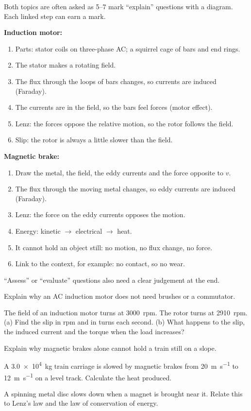 \begin{examtip}[breakable]
Both topics are often asked as 5--7 mark ``explain'' questions with a diagram. Each
linked step can earn a mark.

\textbf{Induction motor:}
\begin{enumerate}
  \item Parts: stator coils on three-phase AC; a squirrel cage of bars and end rings.
  \item The stator makes a rotating field.
  \item The flux through the loops of bars changes, so currents are induced (Faraday).
  \item The currents are in the field, so the bars feel forces (motor effect).
  \item Lenz: the forces oppose the relative motion, so the rotor follows the field.
  \item Slip: the rotor is always a little slower than the field.
\end{enumerate}
\textbf{Magnetic brake:}
\begin{enumerate}
  \item Draw the metal, the field, the eddy currents and the force opposite to $v$.
  \item The flux through the moving metal changes, so eddy currents are induced
        (Faraday).
  \item Lenz: the force on the eddy currents opposes the motion.
  \item Energy: kinetic $\to$ electrical $\to$ heat.
  \item It cannot hold an object still: no motion, no flux change, no force.
  \item Link to the context, for example: no contact, so no wear.
\end{enumerate}
``Assess'' or ``evaluate'' questions also need a clear judgement at the end.
\end{examtip}

\begin{quickcheck}[breakable]
  \item Explain why an AC induction motor does not need brushes or a commutator.
  \item The field of an induction motor turns at \qty{3000}{rpm}. The rotor turns at
        \qty{2910}{rpm}. (a) Find the slip in rpm and in turns each second. (b) What
        happens to the slip, the induced current and the torque when the load increases?
  \item Explain why magnetic brakes alone cannot hold a train still on a slope.
  \item A \qty{3.0e4}{kg} train carriage is slowed by magnetic brakes from
        \qty{20}{m.s^{-1}} to \qty{12}{m.s^{-1}} on a level track. Calculate the heat
        produced.
  \item A spinning metal disc slows down when a magnet is brought near it. Relate this
        to Lenz's law and the law of conservation of energy.
\end{quickcheck}
